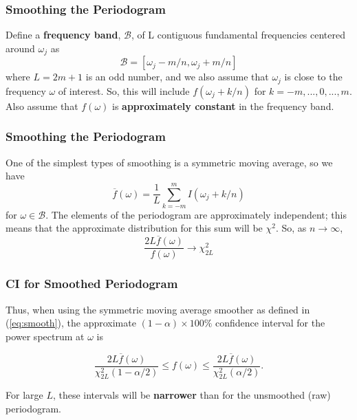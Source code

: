 \documentclass[%
xcolor=pdftex]{beamer}
\begin{document}
\begin{frame}
\frametitle{Smoothing the Periodogram}

Define a \textbf{frequency band}, $\mathcal{B}$, of L contiguous fundamental frequencies centered
around $\omega_j$ as
\begin{equation} \label{eq:band}
\mathcal{B}=[\omega_j-m/n, \omega_j+m/n]
\end{equation}
where $L=2m+1$ is an odd number, and we also assume that
$\omega_j$ is close to the frequency $\omega$ of interest. So,
this will include $f(\omega_j+k/n)$ for $k=-m,...,0,...,m$. Also assume that $f(\omega)$ is \textbf{approximately constant} in the frequency band.

\end{frame}

\begin{frame}
\frametitle{Smoothing the Periodogram}

One of the simplest types of smoothing is a symmetric moving average, so we have
\begin{equation} \label{eq:smooth}
\overline{f}(\omega)=\frac{1}{L} \sum_{k=-m}^{m} I(\omega_j + k/n)
\end{equation}
for $\omega \in \mathcal{B}$. The elements of the periodogram
are approximately independent; this means that the approximate
distribution for this sum will be $\chi^2$.
So, as $n \to \infty$,
\begin{equation} \label{eq:chi}
\frac{2 L  \overline{f}(\omega)}{f(\omega)} \rightarrow \chi_{2 L}^2
\end{equation}

\end{frame}

\begin{frame}
\frametitle{CI for Smoothed Periodogram}

Thus, when using the symmetric moving average smoother as defined in (\ref{eq:smooth}), the approximate $(1-\alpha) \times 100\%$ confidence interval for the power spectrum at $\omega$ is

\begin{equation} \label{eq:CI}
\frac{2 L  \overline{f}(\omega)}{{\chi_{2L}^2(1-\alpha/2)}} \leq f(\omega) \leq \frac{2 L  \overline{f}(\omega)}{{\chi_{2L}^2(\alpha/2)}} .
\end{equation}

For large $L$, these intervals will be \textbf{narrower} than for the unsmoothed (raw) periodogram.

\end{frame}
\end{document}
